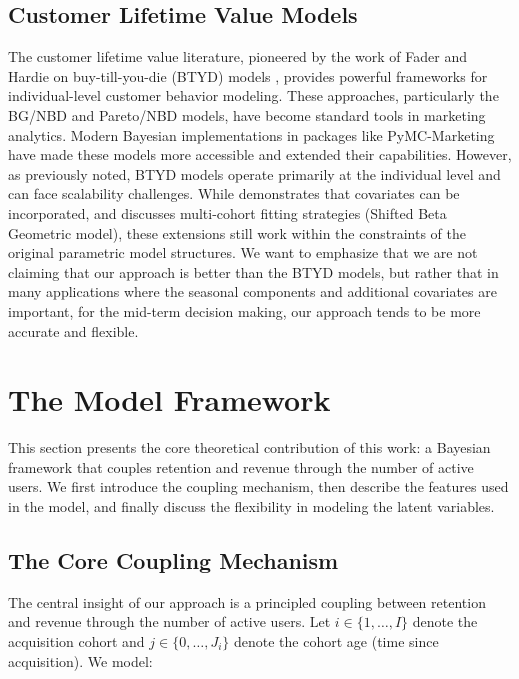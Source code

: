 \documentclass[11pt]{amsart}
\theoremstyle{definition}
\begin{document}
\subsection{Customer Lifetime Value Models}

The customer lifetime value literature, pioneered by the work of Fader and
Hardie on buy-till-you-die (BTYD) models \cite{FaderHardie2005, FaderHardie2007}, provides powerful frameworks for
individual-level customer behavior modeling. These approaches, particularly the BG/NBD and Pareto/NBD models, have become
standard tools in marketing analytics. Modern Bayesian implementations in packages like PyMC-Marketing \cite{pymc_marketing}
have made these models more accessible and extended their capabilities. However, as previously noted, BTYD models operate
primarily at the individual level and can face scalability challenges. While \cite{FaderHardieNote2007} demonstrates that
covariates can be incorporated, and \cite{FaderHardieNote2017} discusses multi-cohort fitting strategies
(Shifted Beta Geometric model), these extensions still work within the constraints of the original parametric model structures.
We want to emphasize that we are not claiming that our approach is better than the BTYD models, but rather that in many
applications where the seasonal components and additional covariates are important, for the mid-term decision making, our approach
tends to be more accurate and flexible.


\section{The Model Framework}\label{sec:model_framework}

This section presents the core theoretical contribution of this work: a Bayesian framework that couples retention and 
revenue through the number of active users. We first introduce the coupling mechanism, then describe the features used 
in the model, and finally discuss the flexibility in modeling the latent variables.

\subsection{The Core Coupling Mechanism}

The central insight of our approach is a principled coupling between retention and revenue through the number of 
active users. Let $i \in \{1, \dots, I\}$ denote the acquisition cohort and $j \in \{0, \dots, J_i\}$ 
denote the cohort age (time since acquisition). We model:
\end{document}
